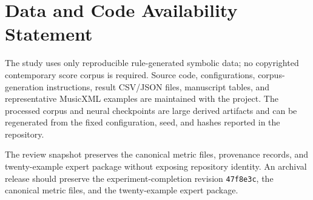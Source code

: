 \section*{Data and Code Availability Statement}

The study uses only reproducible rule-generated symbolic data; no copyrighted contemporary score corpus is required. Source code, configurations, corpus-generation instructions, result CSV/JSON files, manuscript tables, and representative MusicXML examples are maintained with the project. \repositorystatement{} The processed corpus and neural checkpoints are large derived artifacts and can be regenerated from the fixed configuration, seed, and hashes reported in the repository.

\ifdefined\anonymoussubmission
The review snapshot preserves the canonical metric files, provenance records, and twenty-example expert package without exposing repository identity.
\else
An archival release should preserve the experiment-completion revision \texttt{47f8e3c}, the canonical metric files, and the twenty-example expert package.
\fi
